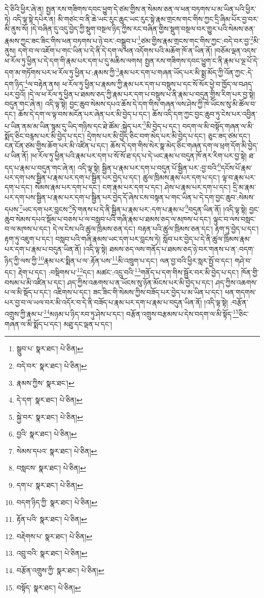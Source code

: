 དེ་ཅིའི་ཕྱིར་ཞེ་ན། སྤྱན་རས་གཟིགས་དབང་ཕྱུག་དེ་ཙམ་གྱིས་ན་སེམས་ཅན་ལ་ཕན་བཏགས་པ་མ་ཡིན་པའི་ཕྱིར་ཏེ། འདི་ལྟ་སྟེ་དཔེར་ན། མི་གཙང་བ་ནི་ཆེ་ཡང་རུང་ཆུང་ཡང་རུང་སྟེ་རྣམ་གྲངས་གང་གིས་ཀྱང་དྲི་ཞིམ་པོར་བྱ་བར་མི་ནུས་སོ། །དེ་བཞིན་དུ་འདུ་བྱེད་ཀྱི་སྡུག་བསྔལ་ཉིད་ཀྱིས་རང་བཞིན་གྱིས་སྡུག་བསྔལ་བར་གྱུར་པའི་སེམས་ཅན་རྣམས་ཀྱང་ཟང་ཟིང་གིས་ཕན་བཏགས་པ་ཉེ་བར་:བསྒྲུབ་པ་\footnote{སྒྲུབ་པ་  སྣར་ཐང་།  པེ་ཅིན། }ཙམ་གྱིས་རྣམ་གྲངས་གང་གིས་ཀྱང་:བདེ་བར་བྱ་\footnote{བདེ་བར་  སྣར་ཐང་།  པེ་ཅིན། }མི་ནུས། དགེ་བ་ལ་འཇོག་པ་གང་ཡིན་པ་དེ་ནི་དེ་དག་ལ་ཕན་འདོགས་པའི་མཆོག་ཁོ་ན་ཡིན་ནོ། །བཅོམ་ལྡན་འདས་ཕ་རོལ་ཏུ་ཕྱིན་པ་དེ་དག་གི་རྣམ་པར་དག་པ་དུ་མཆིས་ལགས། སྤྱན་རས་གཟིགས་དབང་ཕྱུག་ང་ནི་རྣམ་པ་ལྔ་པོ་དེ་དག་མ་གཏོགས་པར་ཕ་རོལ་ཏུ་ཕྱིན་པ་:རྣམས་ཀྱི་\footnote{རྣམས་ཀྱིས་  སྣར་ཐང་། }རྣམ་པར་དག་པ་གཞན་ཡོད་པར་མི་སྨྲ་མོད་ཀྱི་འོན་ཀྱང་:དེ་དག་ཉིད་\footnote{དེ་དག་  སྣར་ཐང་།  པེ་ཅིན། }ལ་བརྟེན་ནས། ཕ་རོལ་ཏུ་ཕྱིན་པ་རྣམས་ཀྱི་རྣམ་པར་དག་པ་བསྡུས་པ་དང་སོ་སོར་ཕྱེ་བ་ཁྱོད་ལ་བཤད་པར་བྱའོ། །དེ་ལ་ཕ་རོལ་ཏུ་ཕྱིན་པ་ཐམས་ཅད་ཀྱི་རྣམ་པར་དག་པ་བསྡུས་པ་ནི་རྣམ་པ་བདུན་གྱིས་རིག་པར་བྱ་སྟེ། བདུན་གང་ཞེ་ན། འདི་ལྟ་སྟེ། བྱང་ཆུབ་སེམས་དཔའ་ཆོས་དེ་དག་གིས་གཞན་ལས་ཤེས་ཀྱི་ཁེ་ཡོངས་སུ་མི་ཚོལ་བ་དང་། ཆོས་དེ་དག་ལ་ལྟ་བས་མངོན་པར་ཞེན་པར་མི་བྱེད་པ་དང་། ཆོས་འདི་དག་ཀྱང་བྱང་ཆུབ་ཏུ་ངེས་པར་འབྱིན་པ་ཡིན་ནམ་མ་ཡིན་སྙམ་དུ་ཡིད་གཉིས་དང་ཐེ་ཚོམ་:སྐྱེད་པར་\footnote{སྐྱེ་བར་  སྣར་ཐང་།  པེ་ཅིན། }མི་བྱེད་པ་དང་། བདག་ལ་མི་བསྟོད་གཞན་ལ་མི་སྨོད་ཅིང་བརྙས་པར་མི་བྱེད་པ་དང་། དྲེགས་པར་མི་བྱེད་ཅིང་བག་མེད་པར་མི་བྱེད་པ་དང་། ཅུང་ཟད་ཙམ་དང་། ངན་ངོན་ཙམ་གྱིས་ཆོག་པར་མི་འཛིན་པ་དང་། ཆོས་དེ་དག་གིས་སེར་སྣ་མེད་ཅིང་གཞན་དག་ལ་ཕྲག་དོག་མི་བྱེད་པ་ཡིན་ནོ། །ཕ་རོལ་ཏུ་ཕྱིན་པའི་རྣམ་པར་དག་པ་སོ་སོ་ཐ་དད་པ་དེ་ཡང་རྣམ་པ་བདུན་ཁོ་ནར་རིག་པར་བྱ་སྟེ། ཐ་དད་པ་རྣམ་པ་བདུན་གང་ཞེ་ན། འདི་ལྟ་སྟེ། སྦྱིན་པ་རྣམ་པར་དག་པ་བདུན་པོ་སྦྱིན་པར་:བྱ་བའི་\footnote{བྱའི་  སྣར་ཐང་།  པེ་ཅིན། }དངོས་པོ་རྣམ་པར་དག་པས་སྦྱིན་པ་རྣམ་པར་དག་པ་སྦྱིན་པར་བྱེད་པ་དང་། ཚུལ་ཁྲིམས་རྣམ་པར་དག་པ་དང་། ལྟ་བ་རྣམ་པར་དག་པ་དང་། སེམས་རྣམ་པར་དག་པ་དང་། ངག་རྣམ་པར་དག་པ་དང་། ཤེས་པ་རྣམ་པར་དག་པ་དང་། དྲི་མ་རྣམ་པར་དག་པས་སྦྱིན་པ་རྣམ་པར་དག་པ་སྦྱིན་པར་བྱེད་དོ་ཞེས་ངས་བསྟན་པ་གང་ཡིན་པ་དེ་དག་བྱང་ཆུབ་:སེམས་དཔས་\footnote{སེམས་དཔའ་  སྣར་ཐང་།  པེ་ཅིན། }ཡང་དག་པར་བླངས་\footnote{བསླངས་  སྣར་ཐང་།  པེ་ཅིན། }ཏེ་གནས་པ་དེ་ནི་སྦྱིན་པ་རྣམ་པར་:དག་པ་རྣམ་པ་\footnote{དག་པ་  སྣར་ཐང་།  པེ་ཅིན། }བདུན་ཡིན་ནོ། །འདི་ལྟ་སྟེ། བྱང་ཆུབ་སེམས་དཔའ་སྡོམ་པ་བཅས་པ་ལ་བསླབ་པའི་གཞི་རྣམ་པ་ཐམས་ཅད་ལ་མཁས་པ་དང་། ལྟུང་བ་ལས་བསླང་བ་ལ་མཁས་པ་དང་། དེ་ལ་ངེས་པའི་ཚུལ་ཁྲིམས་ཅན་དང་། བརྟན་པའི་ཚུལ་ཁྲིམས་ཅན་དང་། རྟག་ཏུ་བྱེད་པ་དང་། རྟག་ཏུ་འཇུག་པ་དང་། བསླབ་པའི་གཞི་རྣམས་ཡང་དག་པར་བླངས་ཏེ། སློབ་པར་བྱེད་པ་དེ་ནི་ཚུལ་ཁྲིམས་རྣམ་པར་དག་པ་རྣམ་པ་བདུན་ཡིན་ནོ། །འདི་ལྟ་སྟེ། ཐམས་ཅད་ལས་གནོད་པ་ཐམས་ཅད་ཉེ་བར་གནས་པ་ན་:བདག་ཉིད་ཀྱི་ལས་ཀྱི་\footnote{བདག་ཉིད་ཀྱི་  སྣར་ཐང་།  པེ་ཅིན། }རྣམ་པར་སྨིན་པ་ལ་:རྟོན་པས་\footnote{རྟོན་པའི་  སྣར་ཐང་།  པེ་ཅིན། }མི་འཁྲུག་པ་དང་། ལན་བྱ་བའི་ཕྱིར་སླར་སྤྱོ་བ་དང་། གཤེ་བ་དང་། རྡེག་པ་དང་། :བསྡིགས་པ་\footnote{བརྡེགས་པ་  སྣར་ཐང་།  པེ་ཅིན། }དང་། མཚང་:འདྲུ་བའི་\footnote{འབྲུ་བའི་  སྣར་ཐང་།  པེ་ཅིན། }གནོད་པ་དག་གིས་སྦྱོར་བར་མི་བྱེད་པ་དང་། ཁོན་གྱི་བསམ་པ་མི་འཛིན་པ་དང་། ཤད་ཀྱིས་འཆགས་པ་ན་ཡོངས་སུ་ཉོན་མོངས་པར་མི་བྱེད་པ་དང་། ཤད་ཀྱིས་འཆགས་པ་ལ་མི་སྡོད་པ་དང་། འཇིགས་པ་དང་། ཟང་ཟིང་གི་སེམས་ཀྱིས་བཟོད་པར་བྱེད་པ་མ་ཡིན་པ་དང་། ཕན་གདགས་པར་བྱ་བ་ལ་ཡལ་བར་མི་འདོར་བ་དེ་ནི་བཟོད་པ་རྣམ་པར་དག་པ་རྣམ་པ་བདུན་ཡིན་ནོ། །འདི་ལྟ་སྟེ། :བརྩོན་འགྲུས་ཀྱི་རྣམ་པ་\footnote{བརྩོན་འགྲུས་ཀྱི་  སྣར་ཐང་།  པེ་ཅིན། }མཉམ་པ་ཉིད་རབ་ཏུ་ཤེས་པ་དང་། བརྩོན་འགྲུས་བརྩམས་པ་དེས་བདག་ལ་མི་སྟོད་\footnote{བསྟོད་  སྣར་ཐང་།  པེ་ཅིན། }ཅིང་གཞན་ལ་མི་སྨོད་པ་དང་། མཐུ་དང་ལྡན་པ་དང་། 